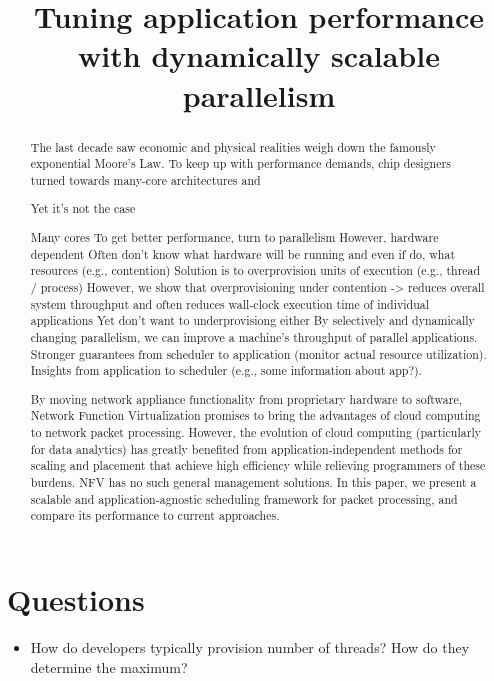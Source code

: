 \documentclass[10pt,preprint]{sigplanconf}
\date{}
\begin{document}
\title{Tuning application performance with dynamically scalable parallelism}
\maketitle

\begin{abstract}
The last decade saw economic and physical realities weigh down the famously exponential Moore's Law. To keep up with performance demands, chip designers turned towards many-core architectures and 

Yet it's not the case

Many cores
To get better performance, turn to parallelism
However, hardware dependent
Often don't know what hardware will be running and even if do, what resources (e.g., contention)
Solution is to overprovision units of execution (e.g., thread / process)
However, we show that overprovisioning under contention -> reduces overall system throughput and often reduces wall-clock execution time of individual applications
Yet don't want to underprovisiong either
By selectively and dynamically changing parallelism, we can improve a machine's throughput of parallel applications.
Stronger guarantees from scheduler to application (monitor actual resource utilization). Insights from application to scheduler (e.g., some information about app?).


By moving network appliance functionality from proprietary hardware to software, Network Function Virtualization promises to bring the advantages of cloud computing to network packet processing. However, the evolution of cloud computing (particularly for data analytics) has greatly benefited from application-independent methods for scaling and placement that achieve high efficiency while relieving programmers of these burdens. NFV has no such general management solutions. In this paper, we present a scalable and application-agnostic scheduling framework for packet processing, and compare its performance to current approaches.
\end{abstract}

\section{Questions}
\begin{itemize}
  \item How do developers typically provision number of threads? How do they determine the maximum?
\end{itemize}
\end{document}
